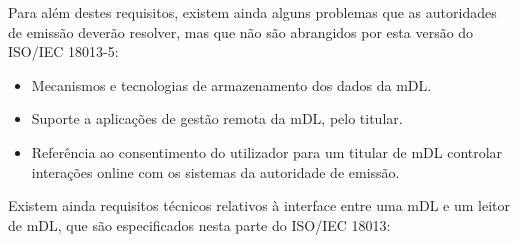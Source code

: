 \documentclass[11pt]{article}
\begin{document}
Para além destes requisitos, existem ainda alguns problemas que as autoridades de emissão deverão resolver, mas que não são abrangidos por esta versão do ISO/IEC 18013-5:

\begin{itemize}
	\item Mecanismos e tecnologias de armazenamento dos dados da mDL.
	\item Suporte a aplicações de gestão remota da mDL, pelo titular.
	\item Referência ao consentimento do utilizador para um titular de mDL controlar interações online com os sistemas da autoridade de emissão.
\end{itemize}

Existem ainda requisitos técnicos relativos à interface entre uma mDL e um leitor de mDL, que são especificados nesta parte do ISO/IEC 18013:
\end{document}
